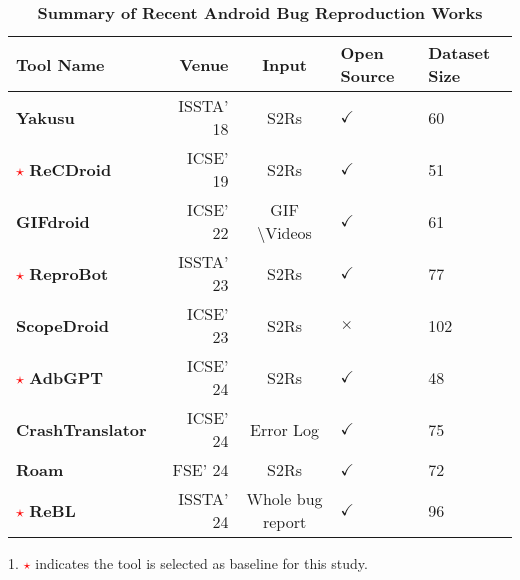 \begin{table}[t]
\vspace{10pt}
\centering
\begin{threeparttable}
\caption{\textbf{Summary of Recent Android Bug Reproduction Works}}
\label{table:toolsummary}
\scriptsize
\begin{tabular}{|l||r|c|p{0.8cm}|p{0.825cm}|}
\hline
\textbf{Tool Name} & \textbf{Venue} & \textbf{Input}  & \textbf{Open Source} & \textbf{Dataset Size} \\ \hline \hline

\textbf{Yakusu}~\cite{fazzini2018automatically}   &  ISSTA' 18  & S2Rs        & $\checkmark$ & 60 \\ \hline
\textcolor{red}{$\star$} \textbf{ReCDroid}~\cite{zhao2019recdroid}    &  ICSE' 19  &    S2Rs       &   $\checkmark$    & 51 \\ \hline
\textbf{GIFdroid}~\cite{feng2022gifdroid}&  ICSE' 22  &    GIF \textbackslash Videos      &   $\checkmark$ &   61 \\ \hline
\textcolor{red}{$\star$} \textbf{ReproBot}~\cite{zhang2023automatically}   &  ISSTA' 23  &  S2Rs         & $\checkmark$ & 77  \\ \hline
\textbf{ScopeDroid}~\cite{huang2023context}    & ICSE' 23   &   S2Rs    &  $\times$   &  102   \\ \hline
\textcolor{red}{$\star$} \textbf{AdbGPT}~\cite{feng2024prompting}   &  ICSE' 24  &    S2Rs         & $\checkmark$ &  48   \\ \hline
\textbf{CrashTranslator}~\cite{huang2024crashtranslator}   & ICSE' 24   &  Error Log       & $\checkmark$   & 75  \\ \hline
\textbf{Roam}~\cite{zhang2024mobile}   & FSE' 24   &   S2Rs      & $\checkmark$ &   72    \\ \hline
\textcolor{red}{$\star$} \textbf{ReBL}~\cite{wang2024feedback}   & ISSTA' 24   &   Whole bug report        & $\checkmark$ &  96  \\ \hline
\end{tabular}
\begin{tablenotes}
\footnotesize
\item[1.] \textcolor{red}{$\star$} indicates the tool is selected as baseline for this study.
\end{tablenotes}
\end{threeparttable}
\vspace{-10pt}
\end{table}

